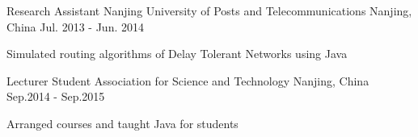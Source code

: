 \begin{cventries}

\cventry
{Research Assistant} %
{Nanjing University of Posts and Telecommunications} %
{Nanjing, China} %
{Jul. 2013 - Jun. 2014} %
{ %
\begin{cvitems}
\item {Simulated routing algorithms of Delay Tolerant Networks using Java}
\end{cvitems}
}

\cventry
{Lecturer}
{Student Association for Science and Technology
}
{Nanjing, China}
{Sep.2014 - Sep.2015}
{\begin{cvitems}
\item {Arranged courses and taught Java for students}
\end{cvitems}}

\end{cventries}